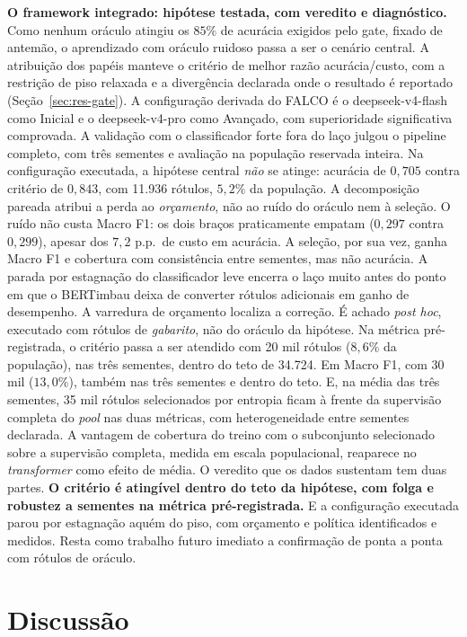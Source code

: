 \textbf{O framework integrado: hipótese testada, com veredito e
diagnóstico.} Como nenhum oráculo atingiu os $85\%$ de acurácia exigidos pelo
gate, fixado de antemão, o aprendizado com oráculo ruidoso passa a ser o
cenário central. A atribuição
dos papéis manteve o critério de melhor razão acurácia/custo, com a restrição
de piso relaxada e a divergência declarada onde o resultado é reportado
(Seção~\ref{sec:res-gate}). A configuração derivada do FALCO é o
deepseek-v4-flash como Inicial e o deepseek-v4-pro como Avançado, com
superioridade significativa comprovada. A validação com o classificador forte fora do laço julgou o pipeline
completo, com três sementes e avaliação na população reservada inteira. Na
configuração executada, a hipótese central \emph{não} se atinge: acurácia de
$0{,}705$ contra critério de $0{,}843$, com 11.936 rótulos, $5{,}2\%$ da
população. A decomposição pareada atribui a perda ao \emph{orçamento}, não ao
ruído do oráculo nem à seleção. O ruído não custa Macro F1: os dois braços
praticamente empatam ($0{,}297$ contra $0{,}299$), apesar dos $7{,}2$ p.p.\ de
custo em acurácia. A seleção, por sua vez, ganha Macro F1 e cobertura com
consistência entre sementes, mas não acurácia. A parada por
estagnação do classificador leve encerra o laço muito antes do ponto em que
o BERTimbau deixa de converter rótulos adicionais em ganho de desempenho. A
varredura de orçamento localiza a correção. É achado \textit{post hoc},
executado com rótulos de \emph{gabarito}, não do oráculo da hipótese. Na
métrica pré-registrada, o critério passa a ser atendido com 20 mil rótulos
($8{,}6\%$ da população), nas três sementes, dentro do teto de 34.724. Em
Macro F1, com 30 mil ($13{,}0\%$), também nas três sementes e dentro do teto.
E, na média das três sementes, 35 mil rótulos selecionados por entropia ficam
à frente da supervisão completa do \textit{pool} nas duas métricas, com
heterogeneidade entre sementes declarada. A vantagem de cobertura do treino
com o subconjunto selecionado sobre a supervisão completa, medida em escala
populacional, reaparece no \textit{transformer} como efeito de média.
O veredito que os dados sustentam tem duas partes. \textbf{O critério é
atingível dentro do teto da hipótese, com folga e robustez a sementes na
métrica pré-registrada.} E a configuração executada parou por estagnação
aquém do piso, com orçamento e política identificados e medidos. Resta como
trabalho futuro imediato a confirmação de ponta a ponta com rótulos de
oráculo.

\section{Discussão}
\label{sec:conc-discussao}


